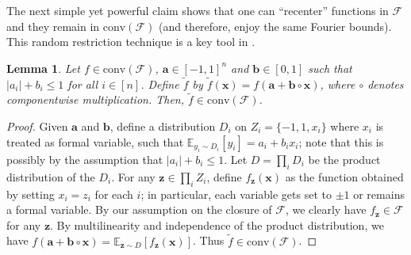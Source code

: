 \documentclass[10pt,a4paper]{article}
\newtheorem{lemma}[theorem]{Lemma}
\theoremstyle{definition}
\begin{document}
The next simple yet powerful claim shows that one can ``recenter'' functions in $\mathcal{F}$ and they remain in $\mathrm{conv}(\mathcal{F})$ (and therefore, enjoy the same Fourier bounds). This random restriction technique is a key tool in \cite{CHHL}.

    \begin{lemma} \label{lem:conv}
        Let $f \in \mathrm{conv}(\mathcal{F})$, $\mathbf{a} \in [-1,1]^n$ and $\mathbf{b} \in [0,1]$ such that $ \vert a_i\vert + b_i \leq 1$ for all $i\in [n]$. 
        Define $\tilde{f} $ by $\tilde{f}(\mathbf{x}) = f(\mathbf{a} + \mathbf{b} \circ \mathbf{x})$, where $\circ$ denotes componentwise multiplication. Then, $\tilde{f}  \in \mathrm{conv}(\mathcal{F})$. 
    \end{lemma}
    \begin{proof}
        Given $\mathbf{a}$ and $\mathbf{b}$, define a distribution $D_i$ on $Z_i= \{ -1,1 , x_i\} $ where $x_i$ is treated as formal variable, such that $\mathbb{E}_{y_i \sim D_i }[ y_i] = a_i + b_i x_i  $; note that this is possibly by the assumption that $\vert a_i\vert + b_i \leq 1$. 
        Let $D = \prod_i D_i  $ be the product distribution of the $D_i$. For any $\mathbf{z} \in \prod_i Z_i $, define $f_{\mathbf{z}}(\mathbf{x})$ as the function obtained by setting $x_i=z_i$ for each $i$; in particular, each variable gets set to $\pm 1$ or remains a formal variable.  By our assumption on the closure of $\mathcal{F}$, we clearly have $f_{\mathbf{z}}\in \mathcal{F}$ for any $\mathbf{z}$. By multilinearity and independence of the product distribution, we have $f(\mathbf{a} + \mathbf{b} \circ \mathbf{x}) = \mathbb{E}_{\mathbf{z} \sim D}[ f_{\mathbf{z}}(\mathbf{x})]  $. Thus $\tilde{f} \in \mathrm{conv}(\mathcal{F})$. 
    \end{proof}
\end{document}
